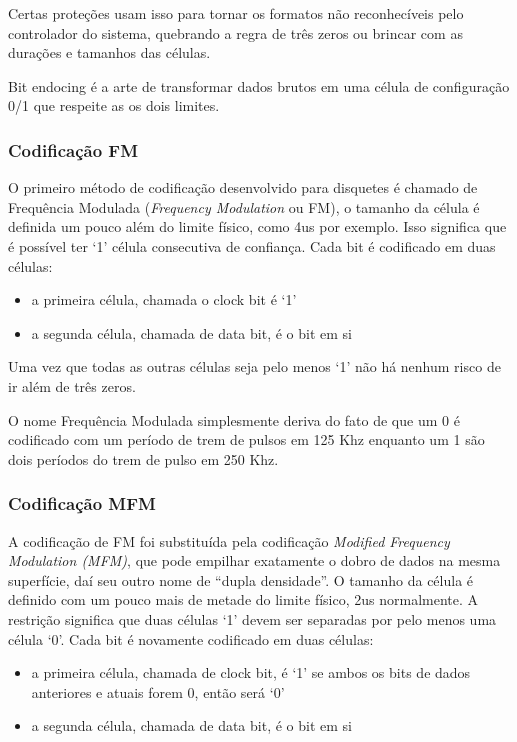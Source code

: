 \documentclass[letterpaper,10pt,brazil]{sphinxmanual}
\begin{document}
Certas proteções usam isso para tornar os formatos não reconhecíveis
pelo controlador do sistema, quebrando a regra de três zeros ou brincar
com as durações e tamanhos das células.

Bit endocing é a arte de transformar dados brutos em uma célula de
configuração 0/1 que respeite as os dois limites.


\subsubsection{Codificação FM}
\label{techspecs/floppy:codificacao-fm}
O primeiro método de codificação desenvolvido para disquetes é chamado
de Frequência Modulada (\emph{Frequency Modulation} ou FM), o tamanho da
célula é definida um pouco além do limite físico, como 4us por exemplo.
Isso significa que é possível ter `1' célula consecutiva de confiança.
Cada bit é codificado em duas células:
\begin{itemize}
\item {} 
a primeira célula, chamada o clock bit é `1'

\item {} 
a segunda célula, chamada de data bit, é o bit em si

\end{itemize}

Uma vez que todas as outras células seja pelo menos `1' não há nenhum
risco de ir além de três zeros.

O nome Frequência Modulada simplesmente deriva do fato de que um 0 é
codificado com um período de trem de pulsos em 125 Khz enquanto um 1
são dois períodos do trem de pulso em 250 Khz.


\subsubsection{Codificação MFM}
\label{techspecs/floppy:codificacao-mfm}
A codificação de FM foi substituída pela codificação \emph{Modified Frequency
Modulation (MFM)}, que pode empilhar exatamente o dobro de dados na
mesma superfície, daí seu outro nome de ``dupla densidade''.
O tamanho da célula é definido com um pouco mais de metade do limite
físico, 2us normalmente. A restrição significa que duas células `1'
devem ser separadas por pelo menos uma célula `0'. Cada bit é novamente
codificado em duas células:
\begin{itemize}
\item {} 
a primeira célula, chamada de clock bit, é `1' se ambos os bits de
dados anteriores e atuais forem 0, então será `0'

\item {} 
a segunda célula, chamada de data bit, é o bit em si

\end{itemize}
\end{document}
